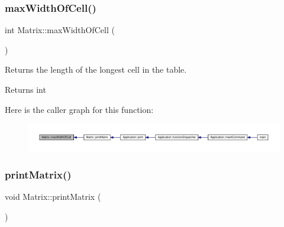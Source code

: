 \subsubsection{\texorpdfstring{max\+Width\+Of\+Cell()}{maxWidthOfCell()}}
{\footnotesize\ttfamily int Matrix\+::max\+Width\+Of\+Cell (\begin{DoxyParamCaption}{ }\end{DoxyParamCaption})\hspace{0.3cm}{\ttfamily [private]}}

Returns the length of the longest cell in the table. \begin{DoxyReturn}{Returns}
int 
\end{DoxyReturn}
Here is the caller graph for this function\+:
\nopagebreak
\begin{figure}[H]
\begin{center}
\leavevmode
\includegraphics[width=350pt]{class_matrix_a60dac9b70e73a12d2adb32d6be9ff65d_icgraph}
\end{center}
\end{figure}
\mbox{\label{class_matrix_aa1967ad240a5ffaf492800044b7275d9}} 
\subsubsection{\texorpdfstring{print\+Matrix()}{printMatrix()}}
{\footnotesize\ttfamily void Matrix\+::print\+Matrix (\begin{DoxyParamCaption}{ }\end{DoxyParamCaption})}

